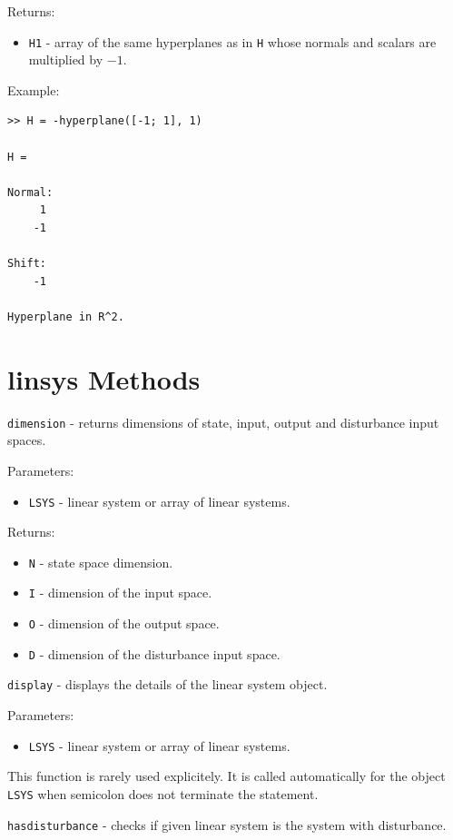 \documentclass{report}
\begin{document}
Returns:
\begin{itemize}
\item {\tt H1} - array of the same hyperplanes as in {\tt H} whose normals and
scalars are multiplied by $-1$.
\end{itemize}

Example:
{\tt \begin{verbatim}
>> H = -hyperplane([-1; 1], 1)

H =

Normal:
     1
    -1

Shift:
    -1

Hyperplane in R^2.
\end{verbatim} }

\newpage

\section{linsys Methods}
{\Large {\tt dimension}} - returns dimensions of state, input, output and
disturbance input spaces.

Parameters:
\begin{itemize}
\item {\tt LSYS} - linear system or array of linear systems.
\end{itemize}

Returns:
\begin{itemize}
\item {\tt N} - state space dimension.
\item {\tt I} - dimension of the input space.
\item {\tt O} - dimension of the output space.
\item {\tt D} - dimension of the disturbance input space.
\end{itemize}

\newpage

{\Large {\tt display}} - displays the details of the linear system object.

Parameters:
\begin{itemize}
\item {\tt LSYS} - linear system or array of linear systems.
\end{itemize}
This function is rarely used explicitely. It is called automatically
for the object {\tt LSYS} when semicolon does not terminate the statement.

\newpage

{\Large {\tt hasdisturbance}} - checks if given linear system is the system
with disturbance.
\end{document}
